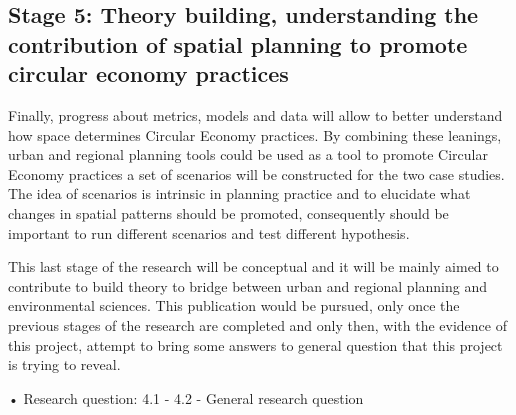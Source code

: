 \subsection{Stage 5: Theory building, understanding the contribution of spatial planning to promote circular economy practices}
Finally, progress about metrics, models and data will allow to better understand how space determines Circular Economy practices. By combining these leanings, urban and regional planning tools could be used as a tool to promote Circular Economy practices a set of scenarios will be constructed for the two case studies. The idea of scenarios is intrinsic in planning practice and to elucidate what changes in spatial patterns should be promoted, consequently should be  important to run different scenarios and test different hypothesis. \par
This last stage of the research will be conceptual and it will be mainly aimed to contribute to build theory to bridge between urban and regional planning and environmental sciences. This publication would be pursued, only once the previous stages of the research are completed and only then, with the evidence of this project, attempt to bring some answers to general question that this project is trying to reveal. \par
•	Research question: 4.1 - 4.2 - General research question        \par

























